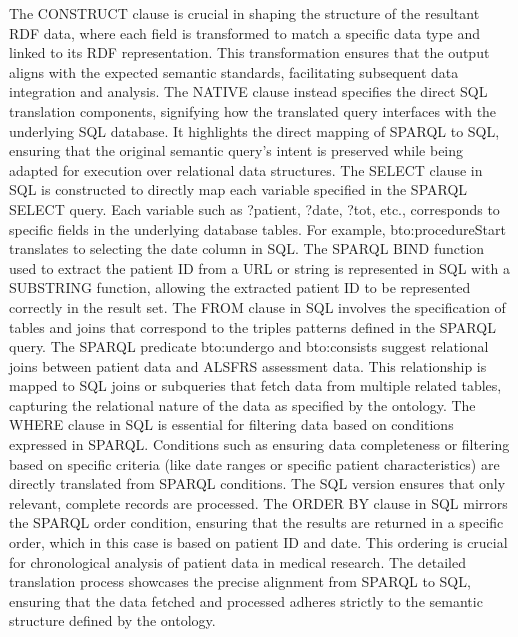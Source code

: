The CONSTRUCT clause is crucial in shaping the structure of the resultant RDF data, where each field is transformed to match a specific data type and linked to its RDF representation. This transformation ensures that the output aligns with the expected semantic standards, facilitating subsequent data integration and analysis.
The NATIVE clause instead specifies the direct SQL translation components, signifying how the translated query interfaces with the underlying SQL database. It highlights the direct mapping of SPARQL to SQL, ensuring that the original semantic query's intent is preserved while being adapted for execution over relational data structures.
The SELECT clause in SQL is constructed to directly map each variable specified in the SPARQL SELECT query. Each variable such as ?patient, ?date, ?tot, etc., corresponds to specific fields in the underlying database tables. For example, bto:procedureStart translates to selecting the date column in SQL. The SPARQL BIND function used to extract the patient ID from a URL or string is represented in SQL with a SUBSTRING function, allowing the extracted patient ID to be represented correctly in the result set.
The FROM clause in SQL involves the specification of tables and joins that correspond to the triples patterns defined in the SPARQL query. The SPARQL predicate bto:undergo and bto:consists suggest relational joins between patient data and ALSFRS assessment data. This relationship is mapped to SQL joins or subqueries that fetch data from multiple related tables, capturing the relational nature of the data as specified by the ontology.
The WHERE clause in SQL is essential for filtering data based on conditions expressed in SPARQL. Conditions such as ensuring data completeness or filtering based on specific criteria (like date ranges or specific patient characteristics) are directly translated from SPARQL conditions. The SQL version ensures that only relevant, complete records are processed.
The ORDER BY clause in SQL mirrors the SPARQL order condition, ensuring that the results are returned in a specific order, which in this case is based on patient ID and date. This ordering is crucial for chronological analysis of patient data in medical research.
The detailed translation process showcases the precise alignment from SPARQL to SQL, ensuring that the data fetched and processed adheres strictly to the semantic structure defined by the ontology.

